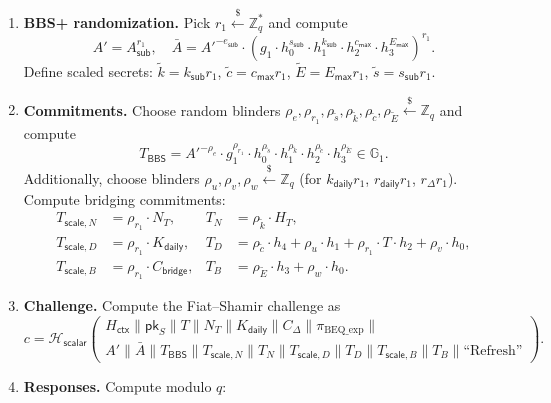 \documentclass[11pt]{article}
\theoremstyle{definitionstyle}
\theoremstyle{plain}
\begin{document}
\begin{enumerate}[leftmargin=*]
\item \textbf{BBS+ randomization.}
  Pick $r_1 \xleftarrow{\$} \mathbb{Z}_q^*$ and compute
  \[
  A' = A_{\mathsf{sub}}^{r_1}, \quad
  \bar{A} = A'^{-e_{\mathsf{sub}}} \cdot \left( g_1 \cdot h_0^{s_{\mathsf{sub}}} \cdot h_1^{k_{\mathsf{sub}}} \cdot h_2^{c_{\mathsf{max}}} \cdot h_3^{E_{\mathsf{max}}} \right)^{r_1}.
  \]
  Define scaled secrets: $\tilde{k} = k_{\mathsf{sub}} r_1$, $\tilde{c} = c_{\mathsf{max}} r_1$, $\tilde{E} = E_{\mathsf{max}} r_1$, $\tilde{s} = s_{\mathsf{sub}} r_1$.
\item \textbf{Commitments.}
  Choose random blinders $\rho_e, \rho_{r_1}, \rho_{\tilde{s}}, \rho_{\tilde{k}}, \rho_{\tilde{c}}, \rho_{\tilde{E}} \xleftarrow{\$} \mathbb{Z}_q$ and compute
  \[
  T_{\mathsf{BBS}} = A'^{-\rho_e} \cdot g_1^{\rho_{r_1}} \cdot h_0^{\rho_{\tilde{s}}} \cdot h_1^{\rho_{\tilde{k}}} \cdot h_2^{\rho_{\tilde{c}}} \cdot h_3^{\rho_{\tilde{E}}} \in \mathbb{G}_1.
  \]
  Additionally, choose blinders $\rho_u, \rho_v, \rho_w \xleftarrow{\$} \mathbb{Z}_q$ (for $k_{\mathsf{daily}} r_1$, $r_{\mathsf{daily}} r_1$, $r_{\Delta} r_1$).
  Compute bridging commitments:
  \begin{align*}
    T_{\mathsf{scale},N} &= \rho_{r_1} \cdot N_T, & T_N &= \rho_{\tilde{k}} \cdot H_T, \\
    T_{\mathsf{scale},D} &= \rho_{r_1} \cdot K_{\mathsf{daily}}, & T_D &= \rho_{\tilde{c}} \cdot h_4 + \rho_u \cdot h_1 + \rho_{r_1} \cdot T \cdot h_2 + \rho_v \cdot h_0, \\
    T_{\mathsf{scale},B} &= \rho_{r_1} \cdot C_{\mathsf{bridge}}, & T_B &= \rho_{\tilde{E}} \cdot h_3 + \rho_w \cdot h_0.
  \end{align*}
\item \textbf{Challenge.}
  Compute the Fiat--Shamir challenge as
  \[
  c = \mathcal{H}_{\mathsf{scalar}}\left(
  \begin{array}{c}
  H_{\mathsf{ctx}} \parallel \mathsf{pk}_S \parallel T \parallel N_T \parallel K_{\mathsf{daily}} \parallel C_{\Delta} \parallel \pi_{\text{BEQ\_exp}} \parallel \\
  A' \parallel \bar{A} \parallel T_{\mathsf{BBS}} \parallel T_{\mathsf{scale},N} \parallel T_N \parallel T_{\mathsf{scale},D} \parallel T_D \parallel T_{\mathsf{scale},B} \parallel T_B \parallel \text{``Refresh''}
  \end{array}
  \right).
  \]
\item \textbf{Responses.}
  Compute modulo $q$:
  \begin{align*}

\end{align*}
\end{enumerate}
\end{document}
